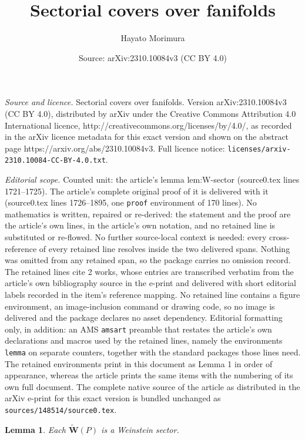 \documentclass[10pt,a4paper]{amsart}
\title{Sectorial covers over fanifolds}
\author{Hayato Morimura}
\date{Source: arXiv:2310.10084v3 (CC BY 4.0)}
\newtheorem{lemma}{Lemma}
\newcommand{\bfW}{\mathbf{W}}
\begin{document}
\maketitle

\noindent\emph{Source and licence.} Sectorial covers over fanifolds. Version arXiv:2310.10084v3 (CC BY 4.0), distributed by arXiv under the Creative Commons Attribution 4.0 International licence, http://creativecommons.org/licenses/by/4.0/, as recorded in the arXiv licence metadata for this exact version and shown on the abstract page https://arxiv.org/abs/2310.10084v3. Full licence notice: \texttt{licenses/arxiv-2310.10084-CC-BY-4.0.txt}.\par\smallskip

\noindent\textit{Editorial scope.} Counted unit: the article's lemma lem:W-sector (source0.tex lines 1721--1725). The article's complete original proof of it is delivered with it (source0.tex lines 1726--1895, one \texttt{proof} environment of 170 lines). No mathematics is written, repaired or re-derived: the statement and the proof are the article's own lines, in the article's own notation, and no retained line is substituted or re-flowed.  No further source-local context is needed: every cross-reference of every retained line resolves inside the two delivered spans.  Nothing was omitted from any retained span, so the package carries no omission record.  The retained lines cite 2 works, whose entries are transcribed verbatim from the article's own bibliography source in the e-print and delivered with short editorial labels recorded in the item's reference mapping.  No retained line contains a figure environment, an image-inclusion command or drawing code, so no image is delivered and the package declares no asset dependency.  Editorial formatting only, in addition: an AMS \texttt{amsart} preamble that restates the article's own declarations and macros used by the retained lines, namely the environments \texttt{lemma} on separate counters, together with the standard packages those lines need.  The retained environments print in this document as Lemma 1 in order of appearance, whereas the article prints the same items with the numbering of its own full document.  The complete native source of the article as distributed in the arXiv e-print for this exact version is bundled unchanged as \texttt{sources/148514/source0.tex}.
\begin{lemma} \label{lem:W-sector}
Each
$\widetilde{\bfW}(P)$
is a Weinstein sector.
\end{lemma}
\end{document}

